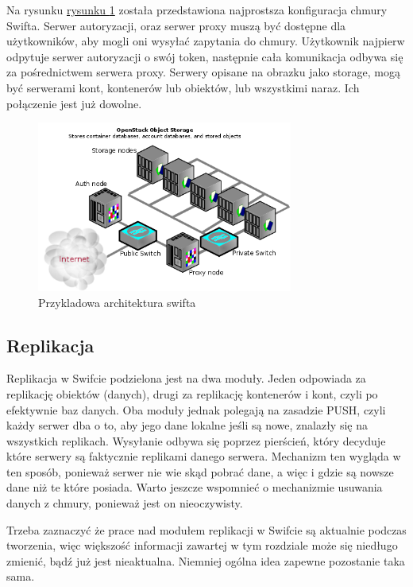 Na rysunku \hyperref[fig:swift_arch]{rysunku \ref{fig:swift_arch}} została przedstawiona najprostsza konfiguracja chmury Swifta. Serwer autoryzacji, oraz serwer proxy muszą być dostępne dla użytkowników, aby mogli oni wysyłać zapytania do chmury. Użytkownik najpierw odpytuje serwer autoryzacji o swój token, następnie cała komunikacja odbywa się za pośrednictwem serwera proxy. Serwery opisane na obrazku jako storage, mogą być serwerami kont, kontenerów lub obiektów, lub wszystkimi naraz. Ich połączenie jest już dowolne.

\begin{figure}
\centering
	\includegraphics[width=0.75\textwidth]{swift_install_arch.png}
	\caption{Przykladowa architektura swifta~\cite{swift_manual}}
\label{fig:swift_arch}
\end{figure}


\subsection{Replikacja}\label{sec:replikacja}

Replikacja w Swifcie podzielona jest na dwa moduły. Jeden odpowiada za replikację obiektów (danych), drugi za replikację kontenerów i kont, czyli po efektywnie baz danych. Oba moduły jednak polegają na zasadzie PUSH, czyli każdy serwer dba o to, aby jego dane lokalne jeśli są nowe, znalazły się na wszystkich replikach. Wysyłanie odbywa się poprzez pierścień, który decyduje które serwery są faktycznie replikami danego serwera. Mechanizm ten wygląda w ten sposób, ponieważ serwer nie wie skąd pobrać dane, a więc i gdzie są nowsze dane niż te które posiada. Warto jeszcze wspomnieć o mechanizmie usuwania danych z chmury, ponieważ jest on nieoczywisty. 

Trzeba zaznaczyć że prace nad modułem replikacji w Swifcie są aktualnie podczas tworzenia, więc większość informacji zawartej w tym rozdziale może się niedługo zmienić, bądź już jest nieaktualna. Niemniej ogólna idea zapewne pozostanie taka sama.

